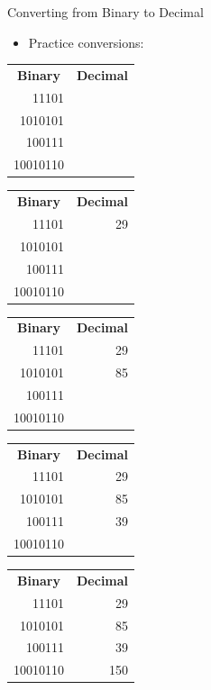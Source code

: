 \documentclass[graphics]{beamer}
\newcommand*{\thead}[1]{\multicolumn{1}{c}{\bfseries #1}}
\begin{document}
\begin{frame}{Converting from Binary to Decimal}
    \begin{itemize}
        \item Practice conversions:
    \end{itemize}
    \centering
     {
        \begin{tabular}{r r}
            \thead{Binary} & \thead{Decimal} \\
             11101 & \\
             1010101 & \\
             100111 & \\
             10010110 &
        \end{tabular}
    }
     {
        \begin{tabular}{r r}
            \thead{Binary} & \thead{Decimal} \\
             11101 & 29 \\
             1010101 & \\
             100111 & \\
             10010110 &
        \end{tabular}
    }
     {
        \begin{tabular}{r r}
            \thead{Binary} & \thead{Decimal} \\
             11101 & 29 \\
             1010101 & 85 \\
             100111 & \\
             10010110 &
        \end{tabular}
    }
     {
        \begin{tabular}{r r}
            \thead{Binary} & \thead{Decimal} \\
             11101 & 29 \\
             1010101 & 85 \\
             100111 & 39 \\
             10010110 &
        \end{tabular}
    }
     {
        \begin{tabular}{r r}
            \thead{Binary} & \thead{Decimal} \\
             11101 & 29 \\
             1010101 & 85 \\
             100111 & 39 \\
             10010110 & 150
        \end{tabular}
    }
\end{frame}
\end{document}
